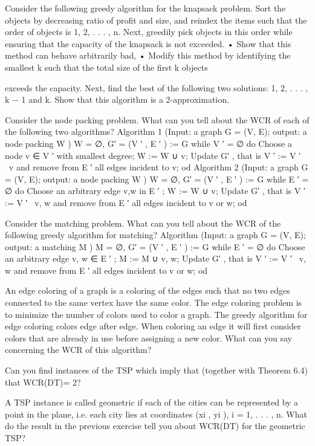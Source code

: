 \begin{exercise}
Consider the following greedy algorithm for the knapsack problem. Sort the objects by decreasing ratio
of profit and size, and reindex the items such that the order of objects is 1, 2, . . . , n. Next, greedily pick
objects in this order while ensuring that the capacity of the knapsack is not exceeded.
• Show that this method can behave arbitrarily bad,
• Modify this method by identifying the smallest k such that the total size of the first k objects

exceeds the capacity. Next, find the best of the following two solutions: {1, 2, . . . , k − 1} and {k}.
Show that this algorithm is a 2-approximation.
\end{exercise}

\begin{exercise}
Consider the node packing problem. What can you tell about the WCR of each of the following two
algorithms?
Algorithm 1 (Input: a graph G = (V, E); output: a node packing W )
W = ∅, G′ = (V ′ , E ′ ) := G
while V ′ = ∅
do
Choose a node v ∈ V ′ with smallest degree;
W := W ∪ {v};
Update G′ , that is V ′ := V ′ \ {v} and remove from E ′ all edges incident to v;
od
Algorithm 2 (Input: a graph G = (V, E); output: a node packing W )
W = ∅, G′ = (V ′ , E ′ ) := G
while E ′ = ∅
do
Choose an arbitrary edge {v,w} in E ′ ;
W := W ∪ {v};
Update G′ , that is V ′ := V ′ \ {v, w} and remove from E ′ all edges incident to v or w;
od
\end{exercise}

\begin{exercise}
Consider the matching problem. What can you tell about the WCR of the following greedy algorithm
for matching?
Algorithm (Input: a graph G = (V, E); output: a matching M )
M = ∅, G′ = (V ′ , E ′ ) := G
while E ′ = ∅
do
Choose an arbitrary edge {v, w} ∈ E ′ ;
M := M ∪ {v, w};
Update G′ , that is V ′ := V ′ \ {v, w} and remove from E ′ all edges incident to v or w;
od
\end{exercise}

\begin{exercise}
An edge coloring of a graph is a coloring of the edges such that no two edges connected to the same
vertex have the same color. The edge coloring problem is to minimize the number of colors used to color
a graph. The greedy algorithm for edge coloring colors edge after edge. When coloring an edge it will
first consider colors that are already in use before assigning a new color. What can you say concerning
the WCR of this algorithm?
\end{exercise}

\begin{exercise}
Can you find instances of the TSP which imply that (together with Theorem 6.4) that WCR(DT)= 2?
\end{exercise}

\begin{exercise}
A TSP instance is called geometric if each of the cities can be represented by a point in the plane, i.e.
each city lies at coordinates (xi , yi ), i = 1, . . . , n. What do the result in the previous exercise tell you
about WCR(DT) for the geometric TSP?
\end{exercise}
